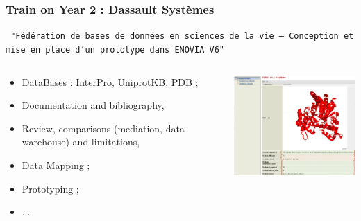 \documentclass{beamer}
\begin{document}
\begin{frame}
	\frametitle{ Train on Year 2 : Dassault Syst{\`e}mes }
	
	\texttt{ \small "F{\'e}d{\'e}ration de bases de donn{\'e}es en sciences de la vie -- Conception et mise en place d'un prototype dans ENOVIA V6"}
	
	\begin{columns}[T]
	\begin{column}[T]{6.0cm}
	
		\begin{itemize}
			\item DataBases : InterPro, UniprotKB, PDB ; 
			\item Documentation and bibliography, 
			\item Review, comparisons (mediation, data warehouse) and limitations, 
			\item Data Mapping ; 
			\item Prototyping ; 
			\item ... 
		\end{itemize}
	
	\end{column}
	\begin{column}[T]{6.5cm}
	
		\includegraphics[width=6.5cm]{img/illustrationStage3DS.png} 
	
	\end{column}
	\end{columns}
	
\end{frame}

\def\titleSubSectionCurriculumPartThree{Data treatment, BioInformatics, Software Dev, Trainer...}
\end{document}
